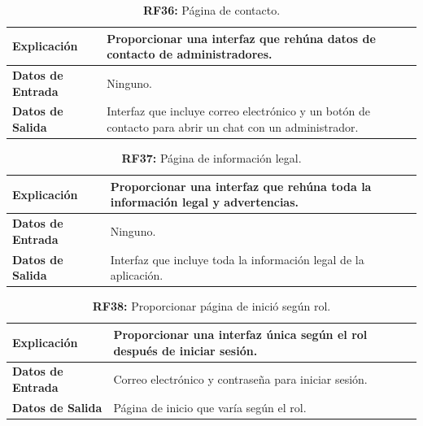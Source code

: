 \documentclass[a4paper, 12pt]{article}
\begin{document}
\begin{table}[H]
\captionsetup{justification=raggedright,singlelinecheck=false}
\caption{\textbf{RF36:} Página de contacto.}
\label{tab:RF36}
	\begin{tabular}{|m{5cm}|m{10cm}|}
	\hline
	\textbf{Explicación} & Proporcionar una interfaz que rehúna datos de contacto de administradores. \\ 
	\hline
	\textbf{Datos de Entrada} & Ninguno. \\ 
	\hline
	\textbf{Datos de Salida} & Interfaz que incluye correo electrónico y un botón de contacto para abrir un chat con un administrador. \\ 
	\hline
\end{tabular}
\end{table}

\begin{table}[H]
\captionsetup{justification=raggedright,singlelinecheck=false}
\caption{\textbf{RF37:} Página de información legal.}
\label{tab:RF37}
	\begin{tabular}{|m{5cm}|m{10cm}|}
	\hline
	\textbf{Explicación} & Proporcionar una interfaz que rehúna toda la información legal y advertencias. \\ 
	\hline
	\textbf{Datos de Entrada} & Ninguno. \\ 
	\hline
	\textbf{Datos de Salida} & Interfaz que incluye toda la información legal de la aplicación. \\ 
	\hline
\end{tabular}
\end{table}

\begin{table}[H]
\captionsetup{justification=raggedright,singlelinecheck=false}
\caption{\textbf{RF38:} Proporcionar página de inició según rol.}
\label{tab:RF38}
	\begin{tabular}{|m{5cm}|m{10cm}|}
	\hline
	\textbf{Explicación} & Proporcionar una interfaz única según el rol después de iniciar sesión. \\ 
	\hline
	\textbf{Datos de Entrada} & Correo electrónico y contraseña para iniciar sesión. \\ 
	\hline
	\textbf{Datos de Salida} & Página de inicio que varía según el rol. \\ 
	\hline
\end{tabular}
\end{table}
\end{document}
